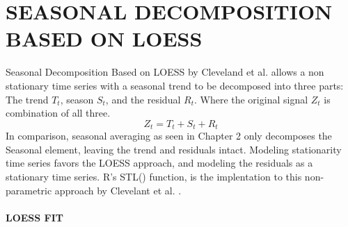 \chapter{SEASONAL DECOMPOSITION BASED ON LOESS}\label{append:STL}

Seasonal Decomposition Based on LOESS by Cleveland et al. \cite{cleveland1990stl} allows a non stationary time series with a seasonal trend to be decomposed into three parts: The trend $T_t$, season $S_t$, and the residual $R_t$. Where the original signal $Z_t$ is combination of all three.
\begin{equation}\label{eq:stl}
Z_t = T_t + S_t + R_t
\end{equation}
In comparison, seasonal averaging as seen in Chapter 2 only decomposes the Seasonal element, leaving the trend and residuals intact. Modeling stationarity time series favors the LOESS approach, and modeling the residuals as a stationary time series. R's STL() function, is the implentation to this non-parametric approach by Clevelant et al. \cite{cleveland1990stl}. 

\subsubsection{LOESS FIT}

